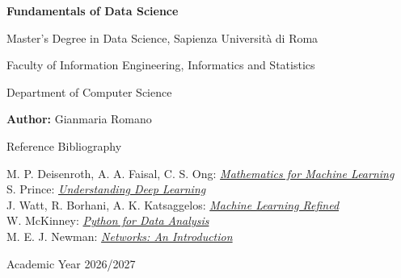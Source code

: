 \documentclass{report}
\begin{document}
\begin{titlepage}
    \centering
    \vspace*{2cm}
    
    {\Huge \bfseries Fundamentals of Data Science \par}
    \vspace{1.5cm}
    
    {\Large Master's Degree in Data Science, Sapienza Università di Roma \par}
    {\large Faculty of Information Engineering, Informatics and Statistics \par}
    \vspace{0.5cm}
    
    {\large Department of Computer Science \par}
    \vspace{3cm}
    
    {\Large \textbf{Author:} Gianmaria Romano \par}
    \vspace{3cm}

    {\Large Reference Bibliography \par}
    {\large M. P. Deisenroth, A. A. Faisal, C. S. Ong: \href{https://mml-book.github.io/}{\textit{Mathematics for Machine Learning}} \\
    S. Prince: \href{https://udlbook.github.io/udlbook/}{\textit{Understanding Deep Learning}} \\
    J. Watt, R. Borhani, A. K. Katsaggelos: \href{https://github.com/neonwatty/machine-learning-refined/tree/main}{\textit{Machine Learning Refined}} \\
    W. McKinney: \href{https://wesmckinney.com/book/preliminaries}{\textit{Python for Data Analysis}} \\
    M. E. J. Newman: \href{https://math.bme.hu/~gabor/oktatas/SztoM/Newman_Networks.pdf}{\textit{Networks: An Introduction}} \\}
    \vfill
    
    {\large Academic Year 2026/2027 \par}
    \vspace*{1cm}
\end{titlepage}

\clearpage
\end{document}
